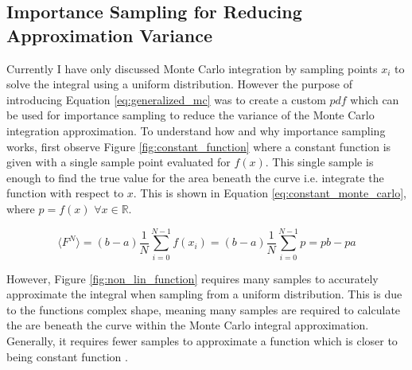 \documentclass[../dissertation.tex]{subfiles}
\begin{document}
\subsection{Importance Sampling for Reducing Approximation Variance}
\label{sec:importance_smapling}

Currently I have only discussed Monte Carlo integration by sampling points $x_i$ to solve the integral using a uniform distribution. However the purpose of introducing Equation \ref{eq:generalized_mc} was to create a custom $pdf$ which can be used for importance sampling to reduce the variance of the Monte Carlo integration approximation. To understand how and why importance sampling works, first observe Figure \ref{fig:constant_function} where a constant function is given with a single sample point evaluated for $f(x)$. This single sample is enough to find the true value for the area beneath the curve i.e. integrate the function with respect to $x$. This is shown in Equation \ref{eq:constant_monte_carlo}, where $p = f(x)$ $ \forall x \in \mathbb{R}$.

\begin{equation}
\label{eq:constant_monte_carlo}
\langle F^N \rangle = (b - a) \frac{1}{N} \sum^{N-1}_{i=0} f(x_i) = (b - a)  \frac{1}{N} \sum^{N-1}_{i=0} p = pb - pa
\end{equation}

However, Figure \ref{fig:non_lin_function} requires many samples to accurately approximate the integral when sampling from a uniform distribution. This is due to the functions complex shape, meaning many samples are required to calculate the are beneath the curve within the Monte Carlo integral approximation. Generally, it requires fewer samples to approximate a function which is closer to being constant function \cite{morokoff1995quasi}.
\end{document}
